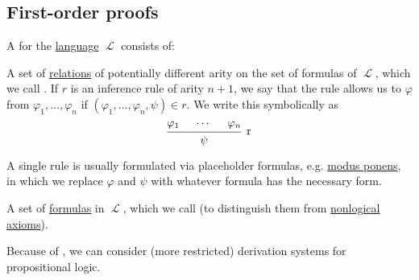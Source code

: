 \subsection{First-order proofs}\label{subsec:first_order_proofs}

\begin{definition}\label{def:first_order_derivation_system}
  A  for the \hyperref[def:first_order_syntax]{language} \( \mscrL \) consists of:

  \begin{thmenum}
     A set of \hyperref[def:relation]{relations} of potentially different arity on the set of formulas of \( \mscrL \), which we call . If \( r \) is an inference rule of arity \( n + 1 \), we say that the rule allows us to  \( \varphi \) from \( \varphi_1, \ldots, \varphi_n \) if \( (\varphi_1, \ldots, \varphi_n, \psi) \in r \). We write this symbolically as
    \begin{equation*}
      \begin{prooftree}
        \hypo{\varphi_1}
        \hypo{\cdots}
        \hypo{\varphi_n}
        \infer3[r]{\psi}
      \end{prooftree}
    \end{equation*}

    A single rule is usually formulated via placeholder formulas, e.g. \hyperref[eq:def:positive_implicational_propositional_derivation_system/rules/modus_ponens]{modus ponens}, in which we replace \( \varphi \) and \( \psi \) with whatever formula has the necessary form.

     A set of \hyperref[def:first_order_syntax]{formulas} in \( \mscrL \), which we call  (to distinguish them from \hyperref[def:first_order_derivability/axioms_and_theorems]{nonlogical axioms}).
  \end{thmenum}

  Because of , we can consider (more restricted) derivation systems for propositional logic.
\end{definition}

